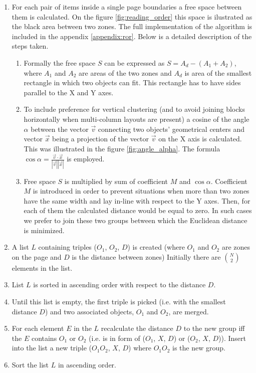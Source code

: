 \begin{enumerate}
\item For each pair of items inside a single page boundaries a free space between them is calculated. On the figure \ref{fig:reading_order} this space is ilustrated as the black area between two zones. The full implementation of the algorithm is included in the appendix \ref{appendix:ror}. Below is a detailed description of the steps taken.
	\begin{enumerate} 
	\item Formally the free space $S$ can be expressed as $S = A_d - (A_1+A_2)$, where $A_1$ and $A_2$ are areas of the two zones and $A_d$ is area of the smallest rectangle in which two objects can fit. This rectangle has to have sides parallel to the X and Y axes.
	\item To include preference for vertical clustering (and to avoid joining blocks horizontally when multi-column layouts are present) a cosine of the angle $\alpha$ between the vector $\vec{v}$ connecting two objects' geometrical centers and vector $\vec{x}$ being a projection of the vector $\vec{v}$ on the X axis is calculated. This was illustrated in the figure \ref{fig:angle_alpha}. The formula $\cos\alpha = \frac{\vec{v} \cdot \vec{x}}{|\vec{v}||\vec{x}|}$ is employed.
	\item Free space $S$ is multiplied by sum of coefficient $M$ and $\cos\alpha$. Coefficient $M$ is introduced in order to prevent situations when more than two zones have the same width and lay in-line with respect to the Y axes. Then, for each of them the calculated distance would be equal to zero. In such cases we prefer to join these two groups between which the Euclidean distance is minimized.
	\end{enumerate}
\item A list $L$ containing triples ($O_1$, $O_2$, $D$) is created (where $O_1$ and $O_2$ are zones on the page and $D$ is the distance between zones) Initially there are $\binom{N}{2}$ elements in the list.
\item List $L$ is sorted in ascending order with respect to the distance $D$. 
\item Until this list is empty, the first triple is picked (i.e. with the smallest distance $D$) and two associated objects, $O_1$ and $O_2$, are merged.
\item For each element $E$ in the $L$ recalculate the distance $D$ to the new group iff the $E$ contains $O_1$ or $O_2$ (i.e. is in form of ($O_1$, $X$, $D$) or ($O_2$, $X$, $D$)).  Insert into the list a new triple ($O_1O_2$, $X$, $D$) where $O_1O_2$ is the new group.
\item Sort the list $L$ in ascending order.
\end{enumerate}
